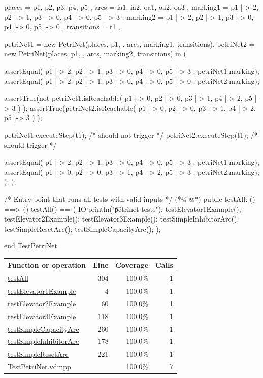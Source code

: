 \begin{vdmpp}
     places = { p1, p2, p3, p4, p5 },
     arcs = { ia1, ia2, oa1, oa2, oa3 },
     marking1 = { p1 |-> 2, p2 |-> 1, p3 |-> 0, p4 |-> 0, p5 |-> 3 },
     marking2 = { p1 |-> 2, p2 |-> 1, p3 |-> 0, p4 |-> 0, p5 |-> 0 },
     transitions = { t1 },

     petriNet1 = new PetriNet(places, p1, {}, arcs, marking1, transitions),
     petriNet2 = new PetriNet(places, p1, {}, arcs, marking2, transitions) in (

      assertEqual({ p1 |-> 2, p2 |-> 1, p3 |-> 0, p4 |-> 0, p5 |-> 3 }, petriNet1.marking);
      assertEqual({ p1 |-> 2, p2 |-> 1, p3 |-> 0, p4 |-> 0, p5 |-> 0 }, petriNet2.marking);

      assertTrue(not petriNet1.isReachable(
        { p1 |-> 0, p2 |-> 0, p3 |-> 1, p4 |-> 2, p5 |-> 3 })
      );
      assertTrue(petriNet2.isReachable(
        { p1 |-> 0, p2 |-> 0, p3 |-> 1, p4 |-> 2, p5 |-> 3 })
      );

      petriNet1.executeStep(t1); /* should not trigger */
      petriNet2.executeStep(t1); /* should trigger */

      assertEqual({ p1 |-> 2, p2 |-> 1, p3 |-> 0, p4 |-> 0, p5 |-> 3 }, petriNet1.marking);
      assertEqual({ p1 |-> 0, p2 |-> 0, p3 |-> 1, p4 |-> 2, p5 |-> 3 }, petriNet2.marking);
    );
  );

  /* Entry point that runs all tests with valid inputs */
(*@
\label{testAll:304}
@*)
  public testAll: () ==> ()
  testAll() == (
    IO`println("\t petrinet tests");
    testElevator1Example();
    testElevator2Example();
    testElevator3Example();
    testSimpleInhibitorArc();
    testSimpleResetArc();
    testSimpleCapacityArc();
  );

end TestPetriNet
\end{vdmpp}
\bigskip
\begin{longtable}{|l|r|r|r|}
\hline
Function or operation & Line & Coverage & Calls \\
\hline
\hline
\hyperref[testAll:304]{testAll} & 304&100.0\% & 1 \\
\hline
\hyperref[testElevator1Example:4]{testElevator1Example} & 4&100.0\% & 1 \\
\hline
\hyperref[testElevator2Example:60]{testElevator2Example} & 60&100.0\% & 1 \\
\hline
\hyperref[testElevator3Example:118]{testElevator3Example} & 118&100.0\% & 1 \\
\hline
\hyperref[testSimpleCapacityArc:260]{testSimpleCapacityArc} & 260&100.0\% & 1 \\
\hline
\hyperref[testSimpleInhibitorArc:178]{testSimpleInhibitorArc} & 178&100.0\% & 1 \\
\hline
\hyperref[testSimpleResetArc:221]{testSimpleResetArc} & 221&100.0\% & 1 \\
\hline
\hline
TestPetriNet.vdmpp & & 100.0\% & 7 \\
\hline
\end{longtable}